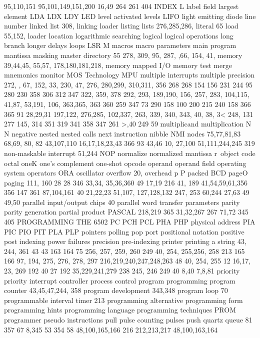 \documentclass{book}
\begin{document}
{{{{{{{{{{{{{{{{{{{{{{{{{{{{{{{{{{{{{{{{{{{{{{{{{{{{{{{{{{{{{{{{{{{{{{{{{{{{{{{{{{{{{{{{{{{{{{{{{{{{{{{{{{{{{{{{{{{{{{{{{{{{{{{{{{{{{{{{{{{{95,110,151
95,101,149,151,200
16,49
264
261
404
INDEX
L
label field
largest element
LDA
LDX
LDY
LED
level activated
levels
LIFO
light emitting diode
line number
linked list
308,
linking loader
listing
lists 276,285,286,
literal 65
load 55,152,
loader
location
logarithmic searching
logical
logical operations
long branch
longer delays
loops
LSR
M
macros
macro parameters
main program
mantissa
masking
master directory
55
278,
309,
95,
287,
,66,
154,
41,
memory 39,44,45, 55,57,
178,180,181,218,
memory mapped I/O
memory test
merge
mnemonics
monitor
MOS Technology
MPU
multiple interrupts
multiple precision
272,
, 67, 152,
33, 230,
47, 276,
280,299,
310,311,
356
268
268
154
156
231
244
95
280
230
358
306
312
347
322, 359, 378
292, 293,
189,190,
156, 257,
283,
104,115,
41,87,
53,191,
106,
363,365,
363
360
259
347
73
290
158
100
200
215
240
158
366
365
91
28,29,31
197,122,
276,285,
102,337,
263,
339, 340,
343,
40,
38, 3<
248,
131
277
145,
314
351
319
341
358
347
261
>,40
249
59
multiplicand
multiplication
N
N
negative
nested
nested calls
next instruction
nibble
NMI
nodes
75,77,81,83
68,69, 80, 82
43,107,110
16,17,18,23,43
366
93
43,46
10, 27,100
51,111,244,245
319
non-maskable interrupt 51,244
NOP
normalize
normalized mantissa
r\
object code
octal
oneK
one's complement
one-shot
opcode
operand
operand field
operating system
operators
ORA
oscillator
overflow 20,
overhead
p
P
packed BCD
pageO
paging
111, 160
28
28
346
33,34, 35,36,360
49
17,19
216
41, 189
41,54,59,61,356
356
147
361
87,104,161
40
21,22,23 51,107,
127,128,132
247, 253
60,244
27,63
49
49,50
parallel input/output chips 40
parallel word transfer
parameters
parity
parity generation
partial product
PASCAL
218,219
365
31,32,267
267
71,72
345
405
PROGRAMMING THE 6502
PC
PCH
PCL
PHA
PHP
physical address
PIA
PIC
PIO
PIT
PLA
PLP
pointers
polling
pop
port
positional notation
positive
post indexing
power failures
precision
pre-indexing
printer
printing a string
43, 244, 361
43
43
163
164
75
256, 257, 259, 260
249
40, 254, 255,256, 258
213
165
166
97, 194, 275, 276, 278, 297
216,219,240,247,248,263
48
40, 254, 255
12
16,17, 23, 269
192
40
27
192
35,229,241,279
238
245, 246
249
40
8,40
7,8,81
priority
priority interrupt controller
process control
program
programming
program counter 43,45,47,244, 358
program development 343,348
program loop 70
programmable interval timer 213
programming alternative
programming form
programming hints
programming language
programming techniques
PROM programmer
pseudo instructions
pull
pulse counting
pulses
push
quartz
queue
81
357
67
8,345
53
354
58
48,100,165,166
216
212,213,217
48,100,163,164
}}}}}}}}}}}}}}}}}}}}}}}}}}}}}}}}}}}}}}}}}}}}}}}}}}}}}}}}}}}}}}}}}}}}}}}}}}}}}}}}}}}}}}}}}}}}}}}}}}}}}}}}}}}}}}}}}}}}}}}}}}}}}}}}}}}}}}}}}}}}
\end{document}
